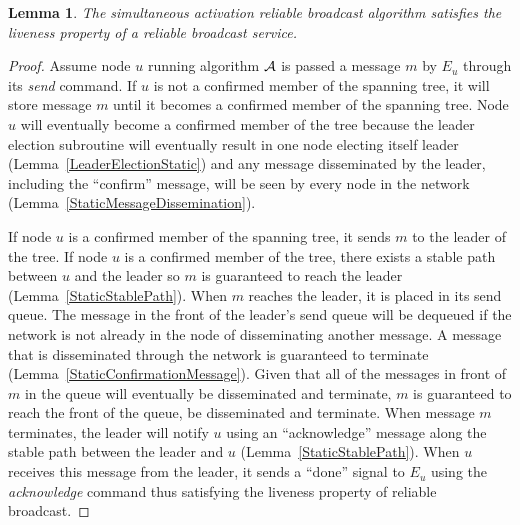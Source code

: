 \documentclass[english]{article}
\newtheorem{lemma}[theorem]{Lemma}
\begin{document}
\begin{lemma}
\label{StaticRBLiveness}
The simultaneous activation reliable broadcast algorithm satisfies the liveness property of a reliable broadcast service.
\end{lemma}
\begin{proof}

Assume node $u$ running algorithm $\cal A$ is passed a message $m$ by $E_u$ through its \textit{send} command. If $u$ is not a confirmed member of the spanning tree, it will store message $m$ until it becomes a confirmed member of the spanning tree. Node $u$ will eventually become a confirmed member of the tree because the leader election subroutine will eventually result in one node electing itself leader (Lemma~\ref{LeaderElectionStatic}) and any message disseminated by the leader, including the ``confirm'' message, will be seen by every node in the network (Lemma~\ref{StaticMessageDissemination}).

If node $u$ is a confirmed member of the spanning tree, it sends $m$ to the leader of the tree. If node $u$ is a confirmed member of the tree, there exists a stable path between $u$ and the leader so $m$ is guaranteed to reach the leader (Lemma~\ref{StaticStablePath}). When $m$ reaches the leader, it is placed in its send queue. The message in the front of the leader's send queue will be dequeued if the network is not already in the node of disseminating another message. A message that is disseminated through the network is guaranteed to terminate (Lemma~\ref{StaticConfirmationMessage}). Given that all of the messages in front of $m$ in the queue will eventually be disseminated and terminate, $m$ is guaranteed to reach the front of the queue, be disseminated and terminate. When message $m$ terminates, the leader will notify $u$ using an ``acknowledge'' message along the stable path between the leader and $u$ (Lemma~\ref{StaticStablePath}). When $u$ receives this message from the leader, it sends  a ``done'' signal to $E_u$ using the \textit{acknowledge} command thus satisfying the liveness property of reliable broadcast.

\end{proof}
\end{document}
